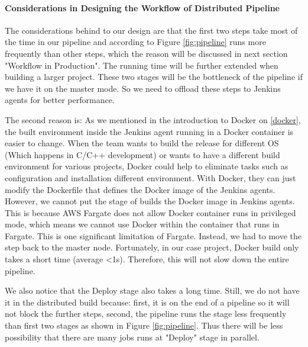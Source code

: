 \paragraph[]{Considerations in Designing the Workflow of Distributed Pipeline}
The considerations behind to our design are that the first two steps take most of the time in our pipeline and according to Figure \ref{fig:pipeline} runs more frequently than other steps, which the reason will be discussed in next section "Workflow in Production". The running time will be further extended when building a larger project. These two stages will be the bottleneck of the pipeline if we have it on the master mode. So we need to offload these steps to Jenkins agents for better performance.
\par
The second reason is: As we mentioned in the introduction to Docker on \ref {docker}, the built environment inside the Jenkins agent running in a Docker container is easier to change.
When the team wants to build the release for different OS (Which happens in C/C++ development) or wants to have a different build environment for various projects, Docker could help to eliminate tasks such as configuration and installation different environment. With Docker, they can just modify the Dockerfile that defines the Docker image of the Jenkins agents. 
However, we cannot put the stage of builds the Docker image in Jenkins agents. This is because AWS Fargate does not allow Docker container runs in privileged mode, which means we cannot use Docker within the container that runs in Fargate. This is one significant limitation of Fargate. Instead, we had to move the step back to the master node. Fortunately, in our case project, Docker build only takes a short time (average <1s). Therefore, this will not slow down the entire pipeline.
\par
We also notice that the Deploy stage also takes a long time. Still, we do not have it in the distributed build because: first, it is on the end of a pipeline so it will not block the further steps, second, the pipeline runs the stage less frequently than first two stages as shown in Figure \ref{fig:pipeline}. Thus there will be less possibility that there are many jobs runs at "Deploy" stage in parallel.
